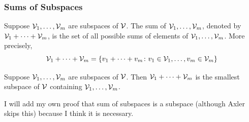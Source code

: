 \subsubsection{Sums of Subspaces}
\begin{definition}
	Suppose $\mathcal{V}_1, \dots , \mathcal{V}_m$ are subspaces of $\mathcal{V}$. The sum of $\mathcal{V}_1, \dots , \mathcal{V}_m$, denoted by $\mathcal{V}_1 + \dots + \mathcal{V}_m$, is the set of all possible sums of elements of $\mathcal{V}_1,\dots , \mathcal{V}_m$. More
	precisely,
	\[\mathcal{V}_1 + \dots + \mathcal{V}_m = \{v_1 + \dots + v_m \colon v_1 \in \mathcal{V}_1, \dots , v_m \in \mathcal{V}_m\}\]
\end{definition}
\begin{theorem}
	Suppose $\mathcal{V}_1, \dots , \mathcal{V}_m$ are subspaces of $\mathcal{V}$. Then $\mathcal{V}_1 + \dots + \mathcal{V}_m$ is the smallest
	subspace of $\mathcal{V}$ containing $\mathcal{V}_1, \dots , \mathcal{V}_m$.
\end{theorem}
\begin{tcolorbox}[colback=yellow!20, colframe=yellow!80!black, title=My thoughts]
	I will add my own proof that sum of subspaces is a subspace (although Axler skips this) because I think it is necessary.
\end{tcolorbox}
